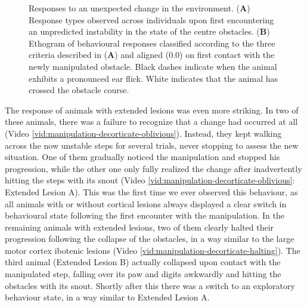\begin{figure}
\centering

\caption{Responses to an unexpected change in the environment. (\textbf{A}) Response types observed across individuals upon first encountering an unpredicted instability in the state of the centre obstacles. (\textbf{B}) Ethogram of behavioural responses classified according to the three criteria described in (\textbf{A}) and aligned (0.0) on first contact with the newly manipulated obstacle. Black dashes indicate when the animal exhibits a pronounced ear flick. White indicates that the animal has crossed the obstacle course.}
\label{fig:ethogram}
\end{figure}

The response of animals with extended lesions was even more striking. In two of these animals, there was a failure to recognize that a change had occurred at all (Video \ref{vid:manipulation-decorticate-oblivious}). Instead, they kept walking across the now unstable steps for several trials, never stopping to assess the new situation. One of them gradually noticed the manipulation and stopped his progression, while the other one only fully realized the change after inadvertently hitting the steps with its snout (Video \ref{vid:manipulation-decorticate-oblivious}: Extended Lesion A). This was the first time we ever observed this behaviour, as all animals with or without cortical lesions always displayed a clear switch in behavioural state following the first encounter with the manipulation. In the remaining animals with extended lesions, two of them clearly halted their progression following the collapse of the obstacles, in a way similar to the large motor cortex ibotenic lesions (Video \ref{vid:manipulation-decorticate-halting}). The third animal (Extended Lesion B) actually collapsed upon contact with the manipulated step, falling over its paw and digits awkwardly and hitting the obstacles with its snout. Shortly after this there was a switch to an exploratory behaviour state, in a way similar to Extended Lesion A.
